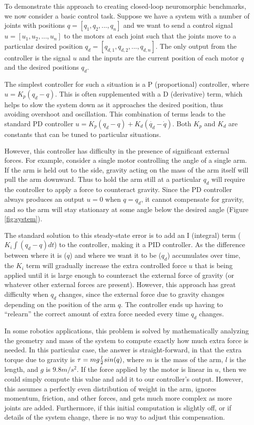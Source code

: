 \documentclass{frontiersSCNS} %
\begin{document}
To demonstrate this approach to creating closed-loop neuromorphic benchmarks,
we now consider a basic control task.  Suppose we have a system with a number
of joints with positions $q = [q_1, q_2, ..., q_n]$ and we want to send a control signal $u = [u_1, u_2, ..., u_n]$ to the motors at each joint
such that
the joints move to a particular desired position $q_d = [q_{d,1}, q_{d,2}, ..., q_{d,n}]$.  The only output from the controller is
the signal $u$ and the inputs are the current position
of each motor $q$ and the desired positions $q_d$.

The simplest controller for such a situation is a P (proportional) controller,
where $u=K_p(q_d - q)$.  This is often supplemented with a D (derivative) term,
which helps to slow the system down as it approaches the desired position,
thus avoiding overshoot and oscillation. This combination of terms leads to the
standard PD controller $u=K_p(q_d - q) + K_d(\dot{q_d} - \dot{q})$.
Both $K_p$ and $K_d$ are constants that can be
tuned to particular situations.

However, this controller has difficulty in the presence of significant external
forces.  For example, consider a single motor controlling the angle of a single
arm.  If the arm is held out to the side, gravity acting on the mass of the
arm itself will pull the arm downward.  Thus to hold the arm still at a
particular $q_d$ will require the controller to apply a force to counteract
gravity.  Since the PD controller always produces an output $u=0$ when $q=q_d$,
it cannot compensate for gravity, and so the arm will stay stationary at some
angle below the desired angle (Figure \ref{fig:system}).

The standard solution to this steady-state error is to add an I (integral) term ($K_i \int{(q_d-q) dt}$)
to the controller, making it a PID controller.  As the difference between where it is ($q$) and
where we want it to be ($q_d$) accumulates over time, the $K_i$ term will gradually increase
the extra controlled force $u$ that is being applied until it is large enough to counteract
the external force of gravity (or whatever other external forces are present).
However, this approach has great difficulty when $q_d$ changes, since the
external force due to gravity changes depending on the position of the arm $q$.
The controller ends up having to ``relearn'' the
correct amount of extra force needed every time $q_d$ changes.

In some robotics applications, this problem is solved by mathematically
analyzing the geometry and mass of the system to compute exactly how much extra
force is needed.  In this particular case, the answer is straight-forward,
in that the extra torque due to gravity is $\tau=mg {l \over 2} sin(q)$, where
$m$ is the mass of the arm, $l$ is the length, and $g$ is $9.8m/s^2$.  If the
force applied by the motor is linear in $u$, then we could simply compute this
value and add it to our controller's output.  However, this assumes a perfectly
even distribution of weight in the arm, ignores momentum, friction, and other forces, and 
gets much more complex as more joints are added.  Furthermore, if this
initial computation is slightly off, or if details of the system change,
there is no way to adjust this compensation.
\end{document}
